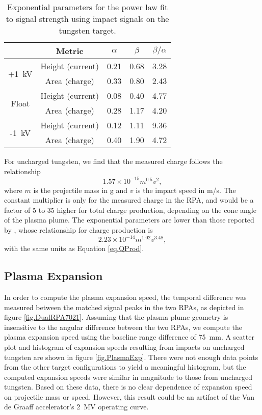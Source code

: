 \begin{table}[\floatplace]
\begin{center}
\begin{tabular}{c|cccc}
&Metric&$\alpha$&$\beta$&$\beta/\alpha$ \\
\hline
\multirow{2}{*}{+1~kV}&Height (current)&	0.21&	0.68&	3.28\\
&Area (charge)&	0.33&	0.80&	2.43\\
\hline
\multirow{2}{*}{Float}&Height (current)&	0.08&	0.40&	4.77\\
&Area (charge)&	0.28&	1.17&	4.20\\
\hline
\multirow{2}{*}{-1~kV}&Height (current)&	0.12&	1.11&	9.36\\
&Area (charge)&	0.40&	1.90&	4.72
\end{tabular}
\end{center}
\caption{\label{tab.MVExponents} Exponential parameters for the power law fit to signal strength using impact signals on the tungsten target.}
\end{table}

For uncharged tungsten, we find that the measured charge follows the relationship
\begin{equation}
\label{eq.QProd}
1.57 \times 10^{-15} m^{0.5}v^2,
\end{equation}
where $m$ is the projectile mass in g and $v$ is the impact speed in m/s.  The constant multiplier is only for the measured charge in the RPA, and would be a factor of 5 to 35 higher for total charge production, depending on the cone angle of the plasma plume.  The exponential parameters are lower than those reported by \citet{McBride1999}, whose relationship for charge production is
\begin{equation}
\label{eq.McBride}
2.23 \times 10^{-14} m^{1.02}v^{3.48},
\end{equation}
with the same units as Equation \ref{eq.QProd}.

\subsection{Plasma Expansion}
In order to compute the plasma expansion speed, the temporal difference was measured between the matched signal peaks in the two RPAs, as depicted in figure \ref{fig.DualRPA7021}.  Assuming that the plasma plume geometry is insensitive to the angular difference between the two RPAs, we compute the plasma expansion speed using the baseline range difference of 75~mm.  A scatter plot and histogram of expansion speeds resulting from impacts on uncharged tungsten are shown in figure \ref{fig.PlasmaExp}.  There were not enough data points from the other target configurations to yield a meaningful histogram, but the computed expansion speeds were similar in magnitude to those from uncharged tungsten.  Based on these data, there is no clear dependence of expansion speed on projectile mass or speed.  However, this result could be an artifact of the Van de Graaff accelerator's 2~MV operating curve.

